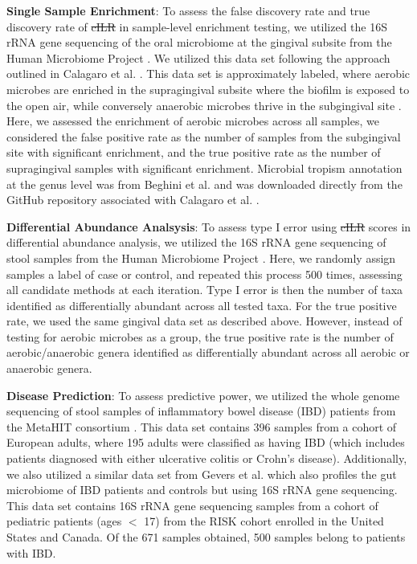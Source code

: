 \documentclass[10pt,letterpaper]{article}
\providecommand{\DIFaddtex}[1]{{\protect\color{blue}\uwave{#1}}} %
\providecommand{\DIFdeltex}[1]{{\protect\color{red}\sout{#1}}}                      %
\providecommand{\DIFaddbegin}{} %
\providecommand{\DIFaddend}{} %
\providecommand{\DIFdelbegin}{} %
\providecommand{\DIFdelend}{} %
\providecommand{\DIFadd}[1]{\texorpdfstring{\DIFaddtex{#1}}{#1}} %
\providecommand{\DIFdel}[1]{\texorpdfstring{\DIFdeltex{#1}}{}} %
\newcommand{\DIFscaledelfig}{0.5}
\newlength{\DIFdelgraphicswidth} %
\newlength{\DIFdelgraphicsheight} %
\newcommand{\DIFaddincludegraphics}[2][]{{\color{blue}\fbox{\DIFOincludegraphics[#1]{#2}}}} %
\newcommand{\DIFdelincludegraphics}[2][]{%
\sbox{\DIFdelgraphicsbox}{\DIFOincludegraphics[#1]{#2}}%
\settoboxwidth{\DIFdelgraphicswidth}{\DIFdelgraphicsbox} %
\settoboxtotalheight{\DIFdelgraphicsheight}{\DIFdelgraphicsbox} %
\scalebox{\DIFscaledelfig}{%
\parbox[b]{\DIFdelgraphicswidth}{\usebox{\DIFdelgraphicsbox}\\[-\baselineskip] \rule{\DIFdelgraphicswidth}{0em}}\llap{\resizebox{\DIFdelgraphicswidth}{\DIFdelgraphicsheight}{%
\setlength{\unitlength}{\DIFdelgraphicswidth}%
\begin{picture}(1,1)%
\thicklines\linethickness{2pt} %
{\color[rgb]{1,0,0}\put(0,0){\framebox(1,1){}}}%
{\color[rgb]{1,0,0}\put(0,0){\line( 1,1){1}}}%
{\color[rgb]{1,0,0}\put(0,1){\line(1,-1){1}}}%
\end{picture}%
}\hspace*{3pt}}} %
} %
\DeclareRobustCommand{\DIFaddbegin}{\DIFOaddbegin \let\includegraphics\DIFaddincludegraphics} %
\DeclareRobustCommand{\DIFaddend}{\DIFOaddend \let\includegraphics\DIFOincludegraphics} %
\DeclareRobustCommand{\DIFdelbegin}{\DIFOdelbegin \let\includegraphics\DIFdelincludegraphics} %
\DeclareRobustCommand{\DIFdelend}{\DIFOaddend \let\includegraphics\DIFOincludegraphics} %
\begin{document}
\noindent \textbf{Single Sample Enrichment}: To assess the false discovery rate and true discovery rate of \DIFdelbegin \DIFdel{cILR }\DIFdelend \DIFaddbegin \DIFadd{CBEA }\DIFaddend in sample-level enrichment testing, we utilized the 16S rRNA gene sequencing of the oral microbiome at the gingival subsite from the Human Microbiome Project \cite{consortium2012, proctor2019}. We utilized this data set following the approach outlined in Calagaro et al. \cite{calgaro2020}. This data set is approximately labeled, where aerobic microbes are enriched in the supragingival subsite where the biofilm is exposed to the open air, while conversely anaerobic microbes thrive in the subgingival site \cite{thurnheer2016}. Here, we assessed the enrichment of aerobic microbes across all samples, we considered the false positive rate as the number of samples from the subgingival site with significant enrichment, and the true positive rate as the number of supragingival samples with significant enrichment. Microbial tropism annotation at the genus level was from Beghini et al. \cite{beghini2019} and was downloaded directly from the GitHub repository associated with Calagaro et al. \cite{matteocalgaro2020}. 

\noindent \textbf{Differential Abundance Analsysis}: To assess type I error using \DIFdelbegin \DIFdel{cILR }\DIFdelend \DIFaddbegin \DIFadd{CBEA }\DIFaddend scores in differential abundance analysis, we utilized the 16S rRNA gene sequencing of stool samples from the Human Microbiome Project \cite{consortium2012, proctor2019}. Here, we randomly assign samples a label of case or control, and repeated this process 500 times, assessing all candidate methods at each iteration. Type I error is then the number of taxa identified as differentially abundant across all tested taxa. For the true positive rate, we used the same gingival data set as described above. However, instead of testing for aerobic microbes as a group, the true positive rate is the number of aerobic/anaerobic genera identified as differentially abundant across all aerobic or anaerobic genera. 

\noindent \textbf{Disease Prediction}: To assess predictive power, we utilized the whole genome sequencing of stool samples of inflammatory bowel disease (IBD) patients from the MetaHIT consortium \cite{nielsen2014}. This data set contains 396 samples from a cohort of European adults, where 195 adults were classified as having IBD (which includes patients diagnosed with either ulcerative colitis or Crohn's disease). Additionally, we also utilized a similar data set from Gevers et al. \cite{gevers2014} which also profiles the gut microbiome of IBD patients and controls but using 16S rRNA gene sequencing. This data set contains 16S rRNA gene sequencing samples from a cohort of pediatric patients (ages $<$ 17) from the RISK cohort enrolled in the United States and Canada. Of the 671 samples obtained, 500 samples belong to patients with IBD. 
\end{document}
